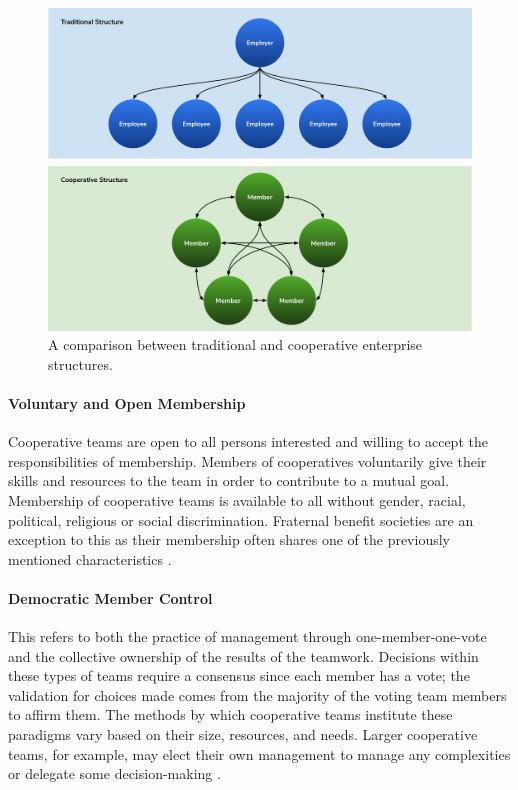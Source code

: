 \begin{figure}[h!]
    \centering
    \includegraphics[width=\linewidth]{Figures/StructureComparison.png}
    \caption{A comparison between traditional and cooperative enterprise structures.}
\end{figure}

\paragraph{Voluntary and Open Membership} Cooperative teams are open to all persons interested and willing to accept the responsibilities of membership. Members of cooperatives voluntarily give their skills and resources to the team in order to contribute to a mutual goal. Membership of cooperative teams is available to all without gender, racial, political, religious or social discrimination. Fraternal benefit societies are an exception to this as their membership often shares one of the previously mentioned characteristics \autocite[16]{boland_introduction_2017}.

\paragraph{Democratic Member Control} This refers to both the practice of management through one-member-one-vote and the collective ownership of the results of the teamwork. Decisions within these types of teams require a consensus since each member has a vote; the validation for choices made comes from the majority of the voting team members to affirm them. The methods by which cooperative teams institute these paradigms vary based on their size, resources, and needs. Larger cooperative teams, for example, may elect their own management to manage any complexities or delegate some decision-making \autocite[21]{northcountry_cooperative_foundation_worker_2006}. 

